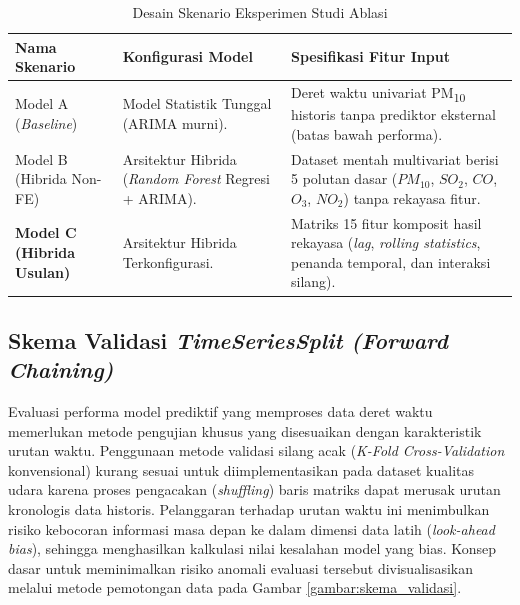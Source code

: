 \begin{table}[htbp]
\centering
\captionsetup{justification=centering}
\setlength{\tabcolsep}{6pt}
\caption{Desain Skenario Eksperimen Studi Ablasi}
\label{tbl:skenario_ablasi}

\begin{tabularx}{\textwidth}{|>{\raggedright\arraybackslash}p{2.8cm}|
                              >{\raggedright\arraybackslash}p{3.4cm}|
                              >{\raggedright\arraybackslash}X|}
\hline
\textbf{Nama Skenario} & \textbf{Konfigurasi Model} & \textbf{Spesifikasi Fitur Input} \\
\hline
Model A (\textit{Baseline}) & Model Statistik Tunggal (ARIMA murni). & Deret waktu univariat PM\textsubscript{10} historis tanpa prediktor eksternal (batas bawah performa). \\
\hline
Model B (Hibrida Non-FE) & Arsitektur Hibrida (\textit{Random Forest} Regresi + ARIMA). & Dataset mentah multivariat berisi 5 polutan dasar ($PM_{10}$, $SO_2$, $CO$, $O_3$, $NO_2$) tanpa rekayasa fitur. \\
\hline
\textbf{Model C (Hibrida Usulan)} & Arsitektur Hibrida Terkonfigurasi. & Matriks 15 fitur komposit hasil rekayasa (\textit{lag}, \textit{rolling statistics}, penanda temporal, dan interaksi silang). \\
\hline
\end{tabularx}
\end{table}

\subsection{Skema Validasi \textit{TimeSeriesSplit (Forward Chaining)}}

Evaluasi performa model prediktif yang memproses data deret waktu memerlukan metode pengujian khusus yang disesuaikan dengan karakteristik urutan waktu. Penggunaan metode validasi silang acak (\textit{K-Fold Cross-Validation} konvensional) kurang sesuai untuk diimplementasikan pada dataset kualitas udara karena proses pengacakan (\textit{shuffling}) baris matriks dapat merusak urutan kronologis data historis. Pelanggaran terhadap urutan waktu ini menimbulkan risiko kebocoran informasi masa depan ke dalam dimensi data latih (\textit{look-ahead bias}), sehingga menghasilkan kalkulasi nilai kesalahan model yang bias. Konsep dasar untuk meminimalkan risiko anomali evaluasi tersebut divisualisasikan melalui metode pemotongan data pada Gambar \ref{gambar:skema_validasi}.

